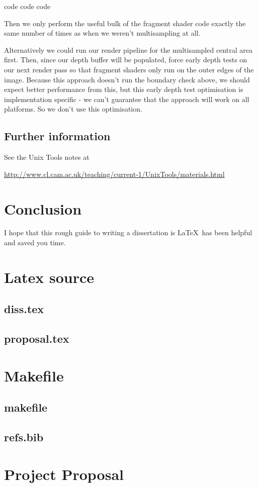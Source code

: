 \documentclass[12pt,a4paper,twoside,openright]{report}
\begin{document}
code
code 
code

Then we only perform the useful bulk of the fragment shader code exactly the same number of times as when we weren't multisampling at all.

Alternatively we could run our render pipeline for the multisampled central area first. Then, since our depth buffer will be populated, force early depth tests on our next render pass so that fragment shaders only run on the outer edges of the image.
Because this approach doesn't run the boundary check above, we should expect better performance from this, but this early depth test optimisation is implementation specific - we can't guarantee that the approach will work on all platforms. So we don't use this optimisation.

	
\section{Further information}

See the Unix Tools notes at

\url{http://www.cl.cam.ac.uk/teaching/current-1/UnixTools/materials.html}


\chapter{Conclusion}

I hope that this rough guide to writing a dissertation is \LaTeX\ has
been helpful and saved you time.




\appendix

\chapter{Latex source}

\section{diss.tex}
{\scriptsize}

\section{proposal.tex}
{\scriptsize}

\chapter{Makefile}

\section{makefile}\label{makefile}
{\scriptsize}

\section{refs.bib}
{\scriptsize}


\chapter{Project Proposal}


\end{document}
